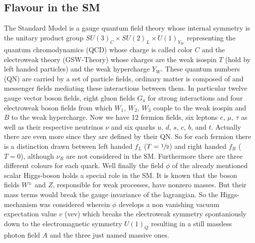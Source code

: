 \subsection{Flavour in the SM}
The Standard Model is a gauge quantum field theory whose internal symmetry is the unitary product group $SU(3)_C\times SU(2)_L\times U(1)_{Y_W}$ representing
the quantum chromodynamics (QCD) whose charge is called color $C$ and the electroweak theory (GSW-Theory) whose charges are the weak isospin $T$ 
(hold by left handed particles) and the weak hypercharge $Y_W$. These quantum numbers (QN) are carried by a set of particle fields, ordinary matter is composed
of and messenger fields mediating these interactions between them. In particular twelve gauge vector boson fields, eight gluon fields $G_a$ for strong 
interactions and four electroweak boson fields from which $W_1$, $W_2$, $W_3$ couple to the weak isospin and $B$ to the weak hypercharge. Now we have 12
fermion fields, six leptons $e$, $\mu$, $\tau$ as well as their respective neutrinos $\nu$ and six quarks $u$, $d$, $s$, $c$, $b$, and $t$. Actually there
are even more since they are defined by their QN. So for each fermion there is a distinction drawn between left handed $f_L$ ($T=\sfrac12$) and right 
handed $f_R$ ($T=0$), although $\nu_R$ are not considered in the SM. Furthermore there are three different colours for each quark. Well finally the field 
$\phi$ of the already mentioned scalar
Higgs-boson holds a special role in the SM. It is known that the boson fields $W^\pm$ and $Z$, responsible for weak processes, have nonzero masses. But their
mass terms would break the gauge invariance of the lagrangian. So the Higgs-mechanism was considered wherein $\phi$ develops a non vanishing vacuum expectation
value $v$ (vev) which breaks the electroweak symmetry spontaniously down to the electromagnetic symmetry $U(1)_Q$ resulting in a still massless photon field 
$A$ and the three just named massive ones.
